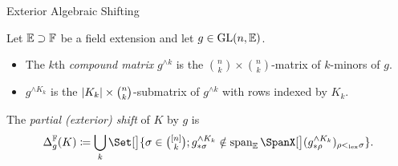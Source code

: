 \documentclass[9pt]{beamer}
\theoremstyle{definition}
\begin{document}
\begin{frame}[fragile]{Exterior Algebraic Shifting}
  \begin{definition}
    Let ${\mathbb E} \supset {\mathbb F}$ be a field extension and let $g \in \mathrm{GL}(n, {\mathbb E})$.
    \begin{itemize}
      \item The $k$th \emph{compound matrix} $g^{\wedge k}$ is the $\binom{n}{k} \times \binom{n}{k}$-matrix
        of $k$-minors of $g$.
        \item $g^{\wedge K_k}$ is the $\lvert K_k\rvert \times \binom{n}{k}$-submatrix of $g^{\wedge k}$ with rows indexed by $K_k$.
    \end{itemize}
    \end{definition}
\begin{definition}\label{def:shift}
  The \emph{partial (exterior) shift} of $K$ by $g$ is
  \begin{equation*}
    \Delta^{\FF}_g(K) \coloneqq \bigcup_{k} \Set[\big]{ \sigma \in \tbinom{[n]}{k}; g^{\wedge K_k}_{*\sigma} \notin \Span_{\EE}[\big]{(g^{\wedge K_k}_{*\rho})_{\rho \lex< \sigma}} }.
  \end{equation*}
\end{definition}
\end{frame}
\end{document}
